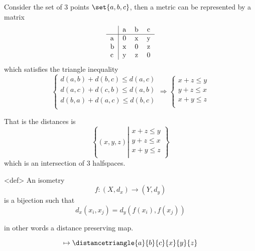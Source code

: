Consider the set of $3$ points $\set{a, b, c}$, then a metric can be
represented by a matrix
\begin{equation}
    \begin{tabular}{l|*{3}c}
          & a & b & c\\
        \hline
        a & 0 & x & y\\
        b & x & 0 & z\\
        c & y & z & 0\\
    \end{tabular}
\end{equation}
which satisfies the triangle inequality
\begin{equation}
    \begin{cases}
        d(a, b) + d(b, c) \le d(a, c)\\
        d(a, c) + d(c, b) \le d(a, b)\\
        d(b, a) + d(a, c) \le d(b, c)\\
    \end{cases}\Rightarrow
    \begin{cases}
        x + z \le y\\
        y + z \le x\\
        x + y \le z\\
    \end{cases}
\end{equation}

That is the distances is
\begin{equation}
    \left\{ %
        (x, y, z)
    \left|
        \begin{split}
            x + z \le y\\
            y + z \le x\\
            x + y \le z\\
        \end{split}
    \right.\right\}
\end{equation}
which is an intersection of $3$ halfspaces.

<def> An isometry
\begin{equation}
    f : (X, d_x) \rightarrow (Y, d_y)
\end{equation}
is a bijection such that
\begin{equation}
    d_x(x_i, x_j) = d_y(f(x_i), f(x_j))
\end{equation}

in other words a distance preserving map.


\begin{equation}
    \mapsto
    \distancetriangle{a}{b}{c}{x}{y}{z}
\end{equation}




